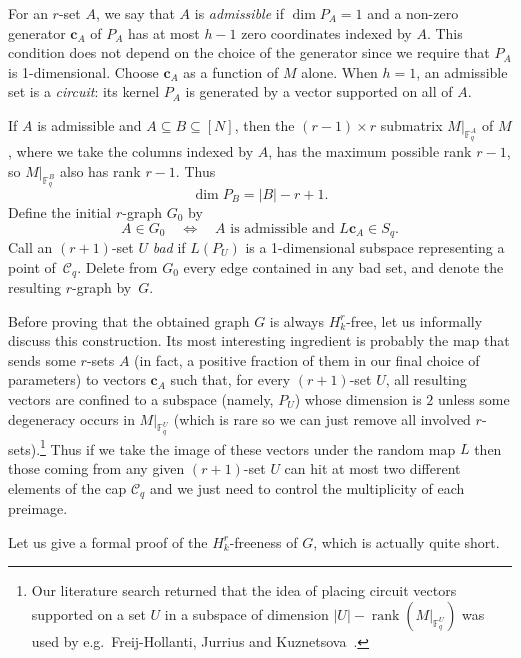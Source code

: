 \documentclass[12pt,a4paper]{article}
\numberwithin{equation}{section}
\theoremstyle{definition}
\theoremstyle{remark}
\newcommand{\V}[1]{\boldsymbol{#1}}
\begin{document}
For an $r$-set $A$, we say that $A$ is \emph{admissible} if $\dim P_A=1$ and a non-zero generator $\V{c}_A$ of $P_A$ has at most $h-1$ zero coordinates indexed by $A$. This condition does not depend on the choice of the generator since we require that $P_A$ is 1-dimensional. Choose $\V{c}_A$ as a function of $M$ alone. When $h=1$, an admissible set is a \emph{circuit}: its kernel $P_A$ is generated by a vector supported on all of $A$.

If $A$ is admissible and $A\subseteq B\subseteq[N]$, then the $(r-1)\times r$ submatrix $M|_{\mathbb F_q^A}$ of $M$, where we take the columns indexed by $A$, has the maximum possible rank $r-1$, so $M|_{\mathbb F_q^B}$ also has rank $r-1$. Thus
\begin{equation}\label{eq:poisson-kernel-dimension}
	\dim P_B=|B|-r+1.
\end{equation}
Define the initial $r$-graph $G_0$ by
\begin{equation*}
	A\in G_0\quad\Longleftrightarrow\quad
	A\text{ is admissible and }L\V{c}_A\in S_q.
\end{equation*}
Call an $(r+1)$-set $U$ \emph{bad} if $L(P_U)$ is a 1-dimensional subspace representing a point of~$\mathcal C_q$. Delete from $G_0$ every edge contained in any bad set, and denote the resulting $r$-graph by~$G$.

Before proving that the obtained graph $G$ is always $H_k^r$-free, let us informally discuss this construction. Its most interesting ingredient is probably the map that sends some $r$-sets $A$ (in fact, a positive fraction of them in our final choice of parameters) to vectors $\V{c}_A$ such that, for every $(r+1)$-set $U$, all resulting vectors are confined  to a subspace (namely, $P_U$) whose dimension is $2$ unless some degeneracy occurs in $M|_{\mathbb F_q^U}$ (which is rare so we can just remove all involved $r$-sets).\footnote{Our literature search returned that the idea of placing circuit vectors supported on a set $U$  in a subspace of dimension $|U|-\operatorname{rank}(M|_{\mathbb F_q^U})$ was used by e.g.\ Freij-Hollanti, Jurrius and Kuznetsova~\cite[Eqs.~(1)--(2)]{FreijHollantiJurriusKuznetsova23}.}
Thus if we take the image of these vectors under the random map $L$ then those coming from any given $(r+1)$-set $U$ can hit at most two different elements of the cap $\mathcal C_q$ and we just need to control the multiplicity of each preimage. 

Let us give a formal proof of the $H_k^r$-freeness of $G$, which is actually quite short.
\end{document}
